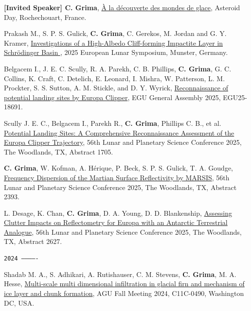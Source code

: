 \begin{etaremune}
\item
    \textbf{[Invited Speaker] C. Grima}, \href{https://cirir-edu.org/programme-asteroid-day-2025/}{À la découverte des mondes de glace}, Asteroid Day, Rochechouart, France.

\item
    Prakash M., S. P. S. Gulick, \textbf{C. Grima}, C. Gerekos, M. Jordan and G. Y. Kramer, \href{https://indico.uni-muenster.de/event/3207/contributions/5543/}{ Investigations of a High-Albedo Cliff-forming Impactite Layer in Schrödinger Basin }, 2025 European Lunar Symposium, Munster, Germany.

\item
    Belgacem I., J. E. C. Scully, R. A. Parekh, C. B. Phillips, \textbf{C. Grima}, G. C. Collins, K. Craft, C. Detelich, E. Leonard, I. Mishra, W. Patterson, L. M. Prockter, S. S. Sutton, A. M. Stickle, and D. Y. Wyrick, \href{https://meetingorganizer.copernicus.org/EGU25/EGU25-18691.html}{Reconnaissance of potential landing sites by Europa Clipper}, EGU General Assembly 2025, EGU25-18691.

\item
     Scully J. E. C., Belgacem I., Parekh R., \textbf{C. Grima}, Phillips C. B., et al. \href{https://www.hou.usra.edu/meetings/lpsc2025/pdf/1705.pdf}{Potential Landing Sites: A Comprehensive Reconnaissance Assessment of the Europa Clipper Trajectory}, 56th Lunar and Planetary Science Conference 2025, The Woodlands, TX, Abstract 1705.

\item
     \textbf{C. Grima}, W. Kofman, A. Hérique, P. Beck, S. P. S. Gulick, T. A. Goudge, \href{https://www.hou.usra.edu/meetings/lpsc2025/pdf/2393.pdf}{Frequency Dispersion of the Martian Surface Reflectivity by MARSIS}, 56th Lunar and Planetary Science Conference 2025, The Woodlands, TX, Abstract 2393.

\item
     L. Desage, K. Chan, \textbf{C. Grima}, D. A. Young, D. D. Blankenship, \href{https://www.hou.usra.edu/meetings/lpsc2025/pdf/2627.pdf}{Assessing Clutter Impacts on Reflectometry for Europa with an Antarctic Terrestrial Analogue}, 56th Lunar and Planetary Science Conference 2025, The Woodlands, TX, Abstract 2627.

\hspace{-2em}\texttt{2024 -------------}

\item
    Shadab M. A., S. Adhikari, A. Rutishauser, C. M. Stevens, \textbf{C. Grima}, M. A. Hesse, \href{https://agu.confex.com/agu/agu24/meetingapp.cgi/Paper/1526301}{Multi-scale multi dimensional infiltration in glacial firn and mechanism of ice layer and chunk formation}, AGU Fall Meeting 2024, C11C-0490, Washington DC, USA.
    

\end{etaremune}
